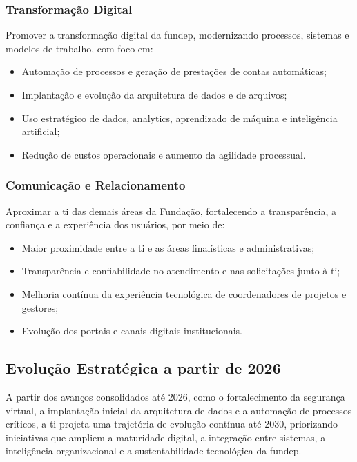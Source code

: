 \documentclass[12pt,a4paper]{article}
\begin{document}
\subsubsection{Transformação Digital}

Promover a transformação digital da \gls{fundep}, modernizando processos, sistemas e modelos de trabalho, com foco em:
\begin{itemize}
  \item Automação de processos e geração de prestações de contas automáticas;
  \item Implantação e evolução da arquitetura de dados e de arquivos;
  \item Uso estratégico de dados, analytics, aprendizado de máquina e inteligência artificial;
  \item Redução de custos operacionais e aumento da agilidade processual.
\end{itemize}

\subsubsection{Comunicação e Relacionamento}

Aproximar a \gls{ti} das demais áreas da Fundação, fortalecendo a transparência, a confiança e a experiência dos usuários, por meio de:
\begin{itemize}
  \item Maior proximidade entre a \gls{ti} e as áreas finalísticas e administrativas;
  \item Transparência e confiabilidade no atendimento e nas solicitações junto à \gls{ti};
  \item Melhoria contínua da experiência tecnológica de coordenadores de projetos e gestores;
  \item Evolução dos portais e canais digitais institucionais.
\end{itemize}

\subsection{Evolução Estratégica a partir de 2026}

A partir dos avanços consolidados até 2026, como o fortalecimento da segurança virtual, a implantação inicial da arquitetura de dados e a automação de processos críticos, a \gls{ti} projeta uma trajetória de evolução contínua até 2030, priorizando iniciativas que ampliem a maturidade digital, a integração entre sistemas, a inteligência organizacional e a sustentabilidade tecnológica da \gls{fundep}.
\end{document}
